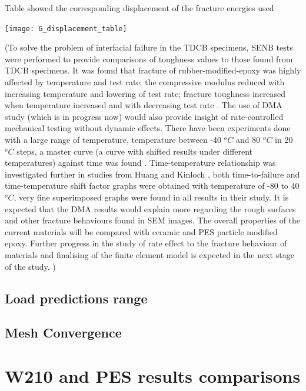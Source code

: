 \documentclass[numbers=noendperiod,chapterprefix=on]{icldt} %
\begin{document}
{   \begin{table}
      \centering
      \caption{Table showed the corresponding displacement of the fracture energies used}\label{G_displacement_table}
      \texttt{[image: G\_displacement\_table]}
      \end{table}     
      \FloatBarrier     


          
(To solve the problem of interfacial failure in the TDCB specimens, SENB tests were performed to provide comparisons of toughness values to those found from TDCB specimens.  
It was found that fracture of rubber-modified-epoxy was highly affected by temperature and test rate; the compressive modulus reduced with increasing temperature and lowering of test rate; fracture toughness increased when temperature increased and with decreasing test rate \cite{Brett2011}. 
The use of DMA study (which is in progress now) would also provide insight of rate-controlled mechanical testing without dynamic effects. There have been experiments done with a large range of temperature, temperature between -40 $^oC$ and 80 $^oC$ in 20 $^oC$ steps, a master curve (a curve with shifted results under different temperatures) against time was found \cite{Brett2011}. Time-temperature relationship was investigated further in studies from Huang and Kinloch \cite{Meschut2013}, both time-to-failure and time-temperature shift factor graphs were obtained with temperature of -80 to 40 $^oC$, very fine superimposed graphs were found in all results in their study. It is expected that the DMA results would explain more regarding the rough surfaces and other fracture behaviours found in SEM images.
The overall properties of the current materials will be compared with ceramic and PES particle modified epoxy. Further progress in the study of rate effect to the fracture behaviour of materials and finalising of the finite element model is expected in the next stage of the study. )

\section{Load predictions range}



\section{Mesh Convergence}



\chapter{W210 and PES results comparisons} \label{W210_PES}


}
\end{document}
